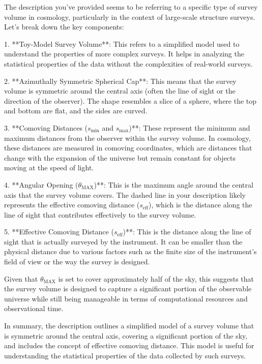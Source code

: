 The description you've provided seems to be referring to a specific type of survey volume in cosmology, particularly in the context of large-scale structure surveys. Let's break down the key components:

1. **Toy-Model Survey Volume**: This refers to a simplified model used to understand the properties of more complex surveys. It helps in analyzing the statistical properties of the data without the complexities of real-world surveys.

2. **Azimuthally Symmetric Spherical Cap**: This means that the survey volume is symmetric around the central axis (often the line of sight or the direction of the observer). The shape resembles a slice of a sphere, where the top and bottom are flat, and the sides are curved.

3. **Comoving Distances ($s_{\mathrm{min}}$ and $s_{\mathrm{max}}$)**: These represent the minimum and maximum distances from the observer within the survey volume. In cosmology, these distances are measured in comoving coordinates, which are distances that change with the expansion of the universe but remain constant for objects moving at the speed of light.

4. **Angular Opening ($\theta_{\mathrm{MAX}}$)**: This is the maximum angle around the central axis that the survey volume covers. The dashed line in your description likely represents the effective comoving distance ($s_{\mathrm{eff}}$), which is the distance along the line of sight that contributes effectively to the survey volume.

5. **Effective Comoving Distance ($s_{\mathrm{eff}}$)**: This is the distance along the line of sight that is actually surveyed by the instrument. It can be smaller than the physical distance due to various factors such as the finite size of the instrument's field of view or the way the survey is designed.

Given that $\theta_{\mathrm{MAX}}$ is set to cover approximately half of the sky, this suggests that the survey volume is designed to capture a significant portion of the observable universe while still being manageable in terms of computational resources and observational time.

In summary, the description outlines a simplified model of a survey volume that is symmetric around the central axis, covering a significant portion of the sky, and includes the concept of effective comoving distance. This model is useful for understanding the statistical properties of the data collected by such surveys.